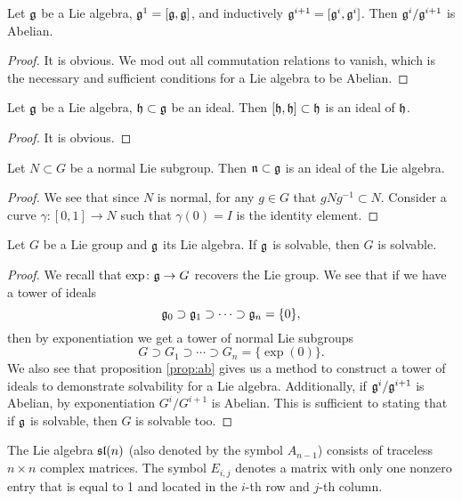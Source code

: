\begin{prop}\label{prop:ab}
Let $\frak{g}$ be a Lie algebra,
$\frak{g}^{1}=[\frak{g},\frak{g}]$, and inductively
$\frak{g}^{i+1}=[\frak{g}^{i},\frak{g}^{i}]$. Then
$\frak{g}^{i}/\frak{g}^{i+1}$ is Abelian.
\end{prop}
\begin{proof}
It is obvious. We mod out all commutation relations to vanish,
which is the necessary and sufficient conditions for a Lie
algebra to be Abelian.
\end{proof}
\begin{prop}
Let $\frak{g}$ be a Lie algebra, $\frak{h}\subset\frak{g}$ be an
ideal. Then $[\frak{h},\frak{h}]\subset\frak{h}$ is an ideal of $\frak{h}$.
\end{prop}
\begin{proof}
It is obvious.
\end{proof}
\begin{prop}
Let $N\subset G$ be a normal Lie subgroup. Then
$\frak{n}\subset\frak{g}$ is an ideal of the Lie algebra.
\end{prop}
\begin{proof}
We see that since $N$ is normal, for any $g\in G$ that
$gNg^{-1}\subset N$. Consider a curve $\gamma\colon[0,1]\to N$
such that $\gamma(0)=I$ is the identity element.
\end{proof}
\begin{thm}
Let $G$ be a Lie group and $\frak{g}$ its Lie algebra. If
$\frak{g}$ is solvable, then $G$ is solvable.
\end{thm}
\begin{proof}
We recall that $\exp\colon\frak{g}\to G$ recovers the Lie
group. We see that if we have a tower of ideals
\begin{equation}
\frak{g}_{0}\supset\frak{g}_{1}\supset\cdots\supset\frak{g}_{n}=\{0\},
\end{equation}
then by exponentiation we get a tower of normal Lie subgroups
\begin{equation}
G\supset G_{1}\supset\cdots\supset G_{n}=\{\exp(0)\}.
\end{equation}
We also see that proposition \ref{prop:ab} gives us a method to
construct a tower of ideals to demonstrate solvability for a Lie
algebra. Additionally, if $\frak{g}^{i}/\frak{g}^{i+1}$ is
Abelian, by exponentiation $G^{i}/G^{i+1}$ is Abelian. This is
sufficient to stating that if $\frak{g}$ is solvable, then $G$ is
solvable too.
\end{proof}
\begin{rmk}
The Lie algebra $\frak{sl}(n)$ (also denoted by the symbol
$A_{n-1}$) consists of traceless $n\times n$ complex
matrices. The symbol $E_{i,j}$ denotes a matrix with only one
nonzero entry that is equal to 1 and located in the $i$-th row
and $j$-th column.
\end{rmk}

